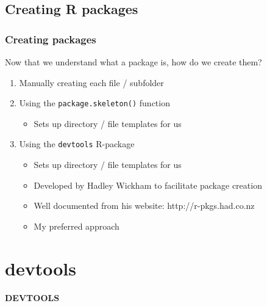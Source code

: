 \documentclass{beamer}
\begin{document}
\subsection{Creating R packages}
\begin{frame}
\frametitle{Creating packages}
Now that we understand what a package is, how do we create them?
\begin{enumerate}
  \item<2-> Manually creating each file / subfolder
  \item<3-> Using the \texttt{package.skeleton()} function
  \begin{itemize}
  	\item<3-> Sets up directory / file templates for us
  \end{itemize}  
  \item<4-> Using the \texttt{devtools} R-package
  \begin{itemize}
  	\item<4-> Sets up directory / file templates for us
  	\item<4-> Developed by Hadley Wickham to facilitate package creation
	\item<4-> Well documented from his website: http://r-pkgs.had.co.nz
	\item<4-> My preferred approach
  \end{itemize}
\end{enumerate}
\end{frame}



\section{devtools}
\begin{frame}
\fontsize{18}{7.2}\selectfont
\centering
\textbf{DEVTOOLS}
\end{frame}
\end{document}
